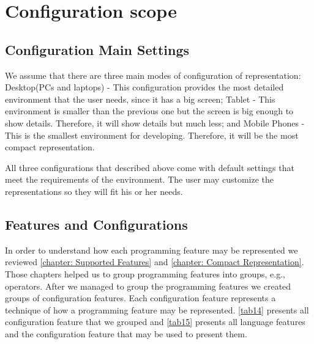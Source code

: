 \section{Configuration scope}
\subsection{Configuration Main Settings}
We assume that there are three main modes of configuration of representation: Desktop(PCs and laptops) - This configuration provides the most detailed environment that the user needs, since it has a big screen; Tablet - This environment is smaller than the previous one but the screen is big enough to show details. Therefore, it will show details but much less; and Mobile Phones - This is the smallest environment for developing. Therefore, it will be the most compact representation. 

All three configurations that described above come with default settings that meet the requirements of the environment. The user may customize the representations so they will fit his or her needs.
\subsection{Features and Configurations}
In order to understand how each programming feature may be represented we reviewed \autoref{chapter: Supported Features} and \autoref{chapter: Compact Representation}. Those chapters helped us to group programming features into groups, e.g., operators. After we managed to group the programming features we created groups of configuration features. Each configuration feature represents a technique of how a programming feature may be represented.
\autoref{tab14} presents all configuration feature that we grouped and \autoref{tab15} presents all language features and the configuration feature that may be used to present them.

